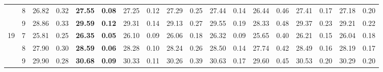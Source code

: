 \documentclass[conference]{IEEEtran}
\begin{document}
\begin{table}[t]
\begin{tabular}{|cc|ll|ll|ll|ll|ll|ll|ll|ll|}
		\multicolumn{1}{|c|}{}                    & 8          & \multicolumn{1}{l|}{26.82}         & 0.32                              & \multicolumn{1}{l|}{\textbf{27.55}} & \textbf{0.08}                     & \multicolumn{1}{l|}{27.25}         & 0.12                              & \multicolumn{1}{l|}{27.29}         & 0.25                              & \multicolumn{1}{l|}{27.44}                & 0.14          & \multicolumn{1}{l|}{26.44} & 0.46 & \multicolumn{1}{l|}{27.41}          & 0.17          & \multicolumn{1}{l|}{27.18} & 0.20 \\ \cline{2-18} 
		\multicolumn{1}{|c|}{}                    & 9          & \multicolumn{1}{l|}{28.86}         & 0.33                              & \multicolumn{1}{l|}{\textbf{29.59}} & \textbf{0.12}                     & \multicolumn{1}{l|}{29.31}         & 0.14                              & \multicolumn{1}{l|}{29.13}         & 0.27                              & \multicolumn{1}{l|}{29.55}                & 0.19          & \multicolumn{1}{l|}{28.33} & 0.48 & \multicolumn{1}{l|}{29.37}          & 0.23          & \multicolumn{1}{l|}{29.21} & 0.22 \\ \hline
		\multicolumn{1}{|c|}{\multirow{3}{*}{19}} & 7          & \multicolumn{1}{l|}{25.81}         & 0.25                              & \multicolumn{1}{l|}{\textbf{26.35}} & \textbf{0.05}                     & \multicolumn{1}{l|}{26.10}         & 0.09                              & \multicolumn{1}{l|}{26.06}         & 0.18                              & \multicolumn{1}{l|}{26.32}                & 0.09          & \multicolumn{1}{l|}{25.65} & 0.40 & \multicolumn{1}{l|}{26.21}          & 0.15          & \multicolumn{1}{l|}{26.04} & 0.18 \\ \cline{2-18} 
		\multicolumn{1}{|c|}{}                    & 8          & \multicolumn{1}{l|}{27.90}         & 0.30                              & \multicolumn{1}{l|}{\textbf{28.59}} & \textbf{0.06}                     & \multicolumn{1}{l|}{28.28}         & 0.10                              & \multicolumn{1}{l|}{28.24}         & 0.26                              & \multicolumn{1}{l|}{28.50}                & 0.14          & \multicolumn{1}{l|}{27.74} & 0.42 & \multicolumn{1}{l|}{28.49}          & 0.16          & \multicolumn{1}{l|}{28.19} & 0.17 \\ \cline{2-18} 
		\multicolumn{1}{|c|}{}                    & 9          & \multicolumn{1}{l|}{29.90}         & 0.28                              & \multicolumn{1}{l|}{\textbf{30.68}} & \textbf{0.09}                     & \multicolumn{1}{l|}{30.33}         & 0.11                              & \multicolumn{1}{l|}{30.26}         & 0.39                              & \multicolumn{1}{l|}{30.63}                & 0.17          & \multicolumn{1}{l|}{29.60} & 0.45 & \multicolumn{1}{l|}{30.53}          & 0.20          & \multicolumn{1}{l|}{30.29} & 0.20 \\ \hline

\end{tabular}
\end{table}
\end{document}
